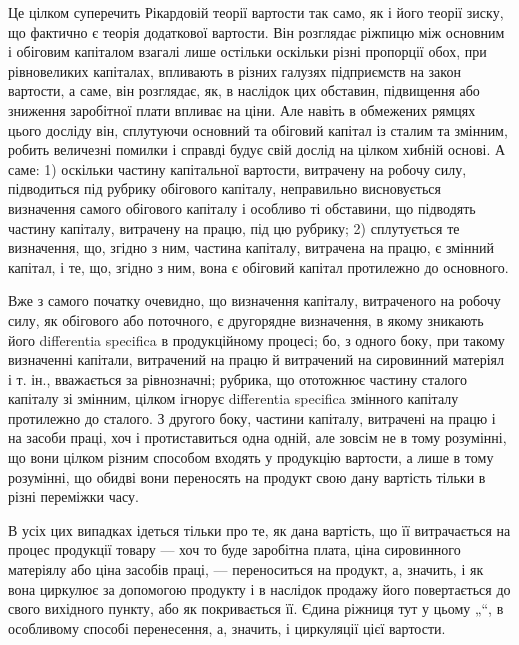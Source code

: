 Це цілком суперечить Рікардовій теорії вартости так само, як і його
теорії зиску, що фактично є теорія додаткової вартости. Він розглядає
ріжпицю між основним і обіговим капіталом взагалі лише остільки
оскільки різні пропорції обох, при рівновеликих капіталах, впливають
в різних галузях підприємств на закон вартости, а саме, він розглядає,
як, в наслідок цих обставин, підвищення або зниження заробітної плати
впливає на ціни. Але навіть в обмежених рямцях цього досліду він, сплутуючи
основний та обіговий капітал із сталим та змінним, робить величезні
помилки і справді будує свій дослід на цілком хибній основі. А
саме: 1) оскільки частину капітальної вартости, витрачену на робочу
силу, підводиться під рубрику обігового капіталу, неправильно висновується
визначення самого обігового капіталу і особливо ті обставини,
що підводять частину капіталу, витрачену на працю, під цю рубрику; 2)
сплутується те визначення, що, згідно з ним, частина капіталу, витрачена
на працю, є змінний капітал, і те, що, згідно з ним, вона є обіговий
капітал протилежно до основного.

Вже з самого початку очевидно, що визначення капіталу, витраченого
на робочу силу, як обігового або поточного, є другорядне визначення,
в якому зникають його differentia specifica в продукційному процесі;
бо, з одного боку, при такому визначенні капітали, витрачений на працю
й витрачений на сировинний матеріял і т. ін., вважається за рівнозначні;
рубрика, що ототожнює частину сталого капіталу зі змінним, цілком ігнорує
differentia specifica змінного капіталу протилежно до сталого. З другого
боку, частини капіталу, витрачені на працю і на засоби праці, хоч
і протиставиться одна одній, але зовсім не в тому розумінні, що вони
цілком різним способом входять у продукцію вартости, а лише в тому
розумінні, що обидві вони переносять на продукт свою дану вартість
тільки в різні переміжки часу.

В усіх цих випадках ідеться тільки про те, як дана вартість, що її
витрачається на процес продукції товару — хоч то буде заробітна плата,
ціна сировинного матеріялу або ціна засобів праці, — переноситься на
продукт, а, значить, і як вона циркулює за допомогою продукту і в наслідок
продажу його повертається до свого вихідного пункту, або як
покривається її. Єдина ріжниця тут у цьому „“, в особливому способі
перенесення, а, значить, і циркуляції цієї вартости.

